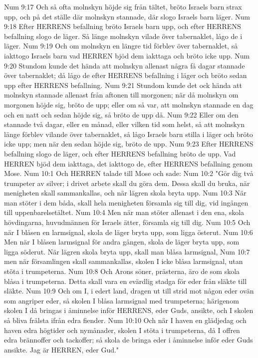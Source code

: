 Num 9:17  Och så ofta molnskyn höjde sig från tältet, bröto Israels barn strax upp, och på det ställe där molnskyn stannade, där slogo Israels barn läger.
Num 9:18  Efter HERRENS befallning bröto Israels barn upp, och efter HERRENS befallning slogo de läger. Så länge molnskyn vilade över tabernaklet, lågo de i läger.
Num 9:19  Och om molnskyn en längre tid förblev över tabernaklet, så iakttogo Israels barn vad HERREN bjöd dem iakttaga och bröto icke upp.
Num 9:20  Stundom kunde det hända att molnskyn allenast några få dagar stannade över tabernaklet; då lågo de efter HERRENS befallning i läger och bröto sedan upp efter HERRENS befallning.
Num 9:21  Stundom kunde det ock hända att molnskyn stannade allenast från aftonen till morgonen; när då molnskyn om morgonen höjde sig, bröto de upp; eller om så var, att molnskyn stannade en dag och en natt och sedan höjde sig, så bröto de upp då.
Num 9:22  Eller om den stannade två dagar, eller en månad, eller vilken tid som helst, så att molnskyn länge förblev vilande över tabernaklet, så lågo Israels barn stilla i läger och bröto icke upp; men när den sedan höjde sig, bröto de upp.
Num 9:23  Efter HERRENS befallning slogo de läger, och efter HERRENS befallning bröto de upp. Vad HERREN bjöd dem iakttaga, det iakttogo de, efter HERRENS befallning genom Mose.
Num 10:1  Och HERREN talade till Mose och sade:
Num 10:2  "Gör dig två trumpeter av silver; i drivet arbete skall du göra dem. Dessa skall du bruka, när menigheten skall sammankallas, och när lägren skola bryta upp.
Num 10:3  När man stöter i dem båda, skall hela menigheten församla sig till dig, vid ingången till uppenbarelsetältet.
Num 10:4  Men när man stöter allenast i den ena, skola hövdingarna, huvudmännen för Israels ätter, församla sig till dig.
Num 10:5  Och när I blåsen en larmsignal, skola de läger bryta upp, som ligga österut.
Num 10:6  Men när I blåsen larmsignal för andra gången, skola de läger bryta upp, som ligga söderut. När lägren skola bryta upp, skall man blåsa larmsignal,
Num 10:7  men när församlingen skall sammankallas, skolen I icke blåsa larmsignal, utan stöta i trumpeterna.
Num 10:8  Och Arons söner, prästerna, äro de som skola blåsa i trumpeterna. Detta skall vara en evärdlig stadga för eder från släkte till släkte.
Num 10:9  Och om I, i edert land, dragen ut till strid mot någon eder ovän som angriper eder, så skolen I blåsa larmsignal med trumpeterna; härigenom skolen I då bringas i åminnelse inför HERRENS, eder Guds, ansikte, och I skolen så bliva frälsta ifrån edra fiender.
Num 10:10  Och när I haven en glädjedag och haven edra högtider och nymånader, skolen I stöta i trumpeterna, då I offren edra brännoffer och tackoffer; så skola de bringa eder i åminnelse inför eder Guds ansikte. Jag är HERREN, eder Gud."
